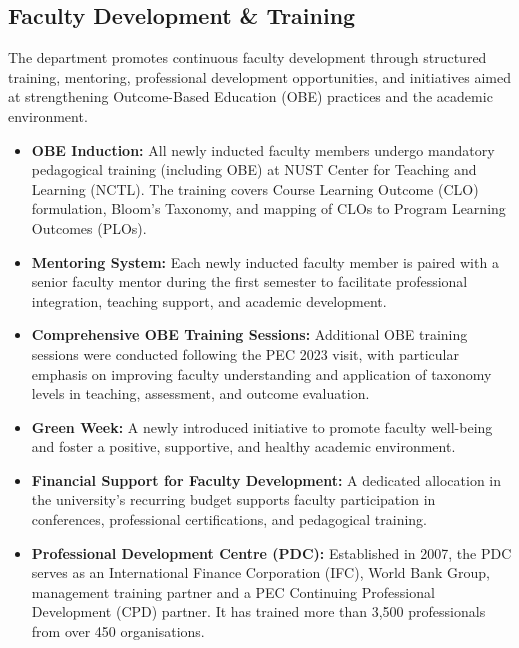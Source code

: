 \subsection{Faculty Development \& Training}
\label{subsec:faculty-development-training}

The department promotes continuous faculty development through
structured training, mentoring, professional development
opportunities, and initiatives aimed at strengthening
Outcome-Based Education (OBE) practices and the academic
environment.

\begin{itemize}[noitemsep, topsep=0pt]

    \item \textbf{OBE Induction:}
    All newly inducted faculty members undergo mandatory pedagogical training (including OBE) at NUST Center for Teaching and Learning (NCTL). The training covers Course Learning Outcome
    (CLO) formulation, Bloom's Taxonomy, and mapping of CLOs
    to Program Learning Outcomes (PLOs).

    \item \textbf{Mentoring System:}
    Each newly inducted faculty member is paired with a
    senior faculty mentor during the first semester to
    facilitate professional integration, teaching support,
    and academic development.

    \item \textbf{Comprehensive OBE Training Sessions:}
    Additional OBE training sessions were conducted following
    the PEC 2023 visit, with particular emphasis on improving
    faculty understanding and application of taxonomy levels
    in teaching, assessment, and outcome evaluation.

    \item \textbf{Green Week:}
    A newly introduced initiative to promote faculty
    well-being and foster a positive, supportive, and
    healthy academic environment.

    \item \textbf{Financial Support for Faculty Development:}
    A dedicated allocation in the university's recurring
    budget supports faculty participation in conferences,
    professional certifications, and pedagogical training.

    \item \textbf{Professional Development Centre (PDC):}
    Established in 2007, the PDC serves as an International
    Finance Corporation (IFC), World Bank Group, management
    training partner and a PEC Continuing Professional
    Development (CPD) partner. It has trained more than
    3,500 professionals from over 450 organisations.

\end{itemize}

